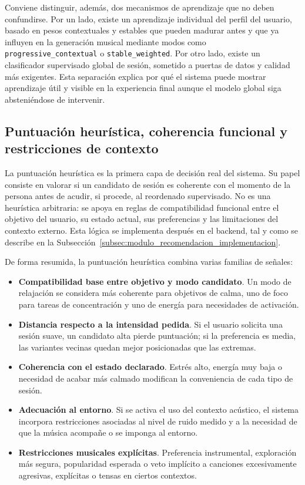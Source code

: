 Conviene distinguir, además, dos mecanismos de aprendizaje que no deben
confundirse. Por un lado, existe un aprendizaje individual del perfil del
usuario, basado en pesos contextuales y estables que pueden madurar antes y que
ya influyen en la generación musical mediante modos como
\texttt{progressive\_contextual} o \texttt{stable\_weighted}. Por otro lado,
existe un clasificador supervisado global de sesión, sometido a puertas de
datos y calidad más exigentes. Esta separación explica por qué el sistema puede mostrar
aprendizaje útil y visible en la experiencia final aunque el modelo global siga
absteniéndose de intervenir.

\subsection{Puntuación heurística, coherencia funcional y restricciones de contexto}

La puntuación heurística es la primera capa de decisión real del sistema. Su
papel consiste en valorar si un candidato de sesión es coherente con el momento
de la persona antes de acudir, si procede, al reordenado supervisado. No es una
heurística arbitraria: se apoya en reglas de compatibilidad funcional entre el
objetivo del usuario, su estado actual, sus preferencias y las limitaciones del
contexto externo. Esta lógica se implementa después en el backend, tal y como
se describe en la Sub\-sección~\ref{subsec:modulo_recomendacion_implementacion}.

De forma resumida, la puntuación heurística combina varias familias de señales:

\begin{itemize}
    \item \textbf{Compatibilidad base entre objetivo y modo candidato}. Un modo
    de relajación se considera más coherente para objetivos de calma, uno de
    foco para tareas de concentración y uno de energía para necesidades de
    activación.
    \item \textbf{Distancia respecto a la intensidad pedida}. Si el usuario
    solicita una sesión suave, un candidato alta pierde
    puntuación; si la preferencia es media, las variantes vecinas quedan
    mejor posicionadas que las extremas.
    \item \textbf{Coherencia con el estado declarado}. Estrés alto, energía muy
    baja o necesidad de acabar más calmado modifican la conveniencia de
    cada tipo de sesión.
    \item \textbf{Adecuación al entorno}. Si se activa el uso del contexto
    acústico, el sistema incorpora restricciones asociadas al nivel de ruido
    medido y a la necesidad de que la música acompañe o se imponga al entorno.
    \item \textbf{Restricciones musicales explícitas}. Preferencia
    instrumental, exploración más segura, popularidad esperada o veto implícito
    a canciones excesivamente agresivas, explícitas o tensas en ciertos
    contextos.
\end{itemize}

